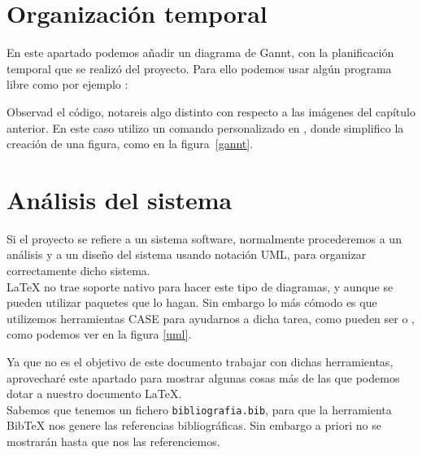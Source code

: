 

\section{Organización temporal}

En este apartado podemos añadir un diagrama de Gannt, con la
planificación temporal que se realizó del proyecto. Para ello podemos
usar algún programa libre como por ejemplo :


Observad el código, notareis algo distinto con respecto a las imágenes
del capítulo anterior. En este caso utilizo un comando personalizado
en , donde simplifico la creación de una
figura, como en la figura~\ref{gannt}. %

\section{Análisis del sistema}

Si el proyecto se refiere a un sistema software, normalmente
procederemos a un análisis y a un diseño del sistema usando notación
UML, para organizar correctamente dicho sistema.\\

\LaTeX{} no trae soporte nativo para hacer este tipo de diagramas, y
aunque se pueden utilizar paquetes que lo hagan. Sin embargo lo más
cómodo es que utilizemos herramientas CASE para ayudarnos a dicha
tarea, como pueden ser  o , como
podemos ver en la figura \ref{uml}.


Ya que no es el objetivo de este documento trabajar con dichas
herramientas, aprovecharé este apartado para mostrar algunas
cosas más de las que podemos dotar a nuestro documento \LaTeX{}.\\

Sabemos que tenemos un fichero \texttt{bibliografia.bib}, para que la
herramienta Bib\TeX{}  nos genere las referencias bibliográficas. Sin
embargo a priori no se mostrarán hasta que nos las referenciemos.\\

